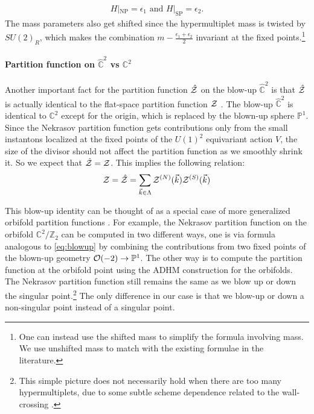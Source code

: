 \documentclass[letterpaper, 11pt]{article}
\def\IC{\mathbb{C}}
\def\IP{\mathbb{P}}
\def\IZ{\mathbb{Z}}
\def\CO{{\cal O}}
\def\CZ{{\cal Z}}
\def\e{\epsilon}
\begin{document}
\begin{align}
  H|_\text{NP} = \epsilon_1 \text{ and } H|_\text{SP} = \epsilon_2.
\end{align}
The mass parameters also get shifted since the hypermultiplet mass is twisted by $SU(2)_R$, which makes the combination $m - \frac{\e_1+\e_2}{2}$ invariant at the fixed points.\footnote{One can instead use the shifted mass to simplify the formula involving mass. We use unshifted mass to match with the existing formulae in the literature.} 

\paragraph{Partition function on $\hat{\IC}^2$ vs $\IC^2$}
Another important fact for the partition function $\hat{\CZ}$ on the blow-up $\hat{\IC}^2$ is that $\hat{\CZ}$ is actually identical to the flat-space partition function $\CZ$  \cite{Nakajima:2003pg,Nakajima:2003uh,Nakajima:2005fg, Gottsche:2006bm, Nakajima:2009qjc, Gottsche:2010ig}.
The blow-up $\hat{\IC}^2$ is identical to $\IC^2$ except for the origin, which is replaced by the blown-up sphere $\IP^1$. 
Since the Nekrasov partition function gets contributions only from the small instantons localized at the fixed points of the $U(1)^2$ equivariant action $V$, the size of the divisor should not affect the partition function as we smoothly shrink it. So we expect that $\hat{\CZ} = \CZ$. This implies the following relation: 
\begin{align} 
  \label{eq:blowup-generic}
  \CZ = \hat{\CZ} = \sum_{\vec{k} \in \Lambda} \CZ^{(N)}(\vec{k}) \CZ^{(S)}(\vec{k})
\end{align}

This blow-up identity can be thought of as a special case of more generalized  orbifold partition functions \cite{Sasaki:2006vq,Bonelli:2012ny,Ito:2013kpa}. %
For example, the Nekrasov partition function on the orbifold $\IC^2/\IZ_2$ can be computed in two different ways, one is via formula analogous to \eqref{eq:blowup} by combining the contributions from two fixed points of the blown-up geometry $\CO(-2) \to \IP^1$. The other way is to compute the partition function at the orbifold point using the ADHM construction for the orbifolds. The Nekrasov partition function still remains the same as we blow up or down the singular point.\footnote{This simple picture does not necessarily hold when there are too many hypermultiplets, due to some subtle scheme dependence related to the wall-crossing \cite{Ito:2013kpa}.} 
The only difference in our case is that we blow-up or down a non-singular point instead of a singular point. 
\end{document}
